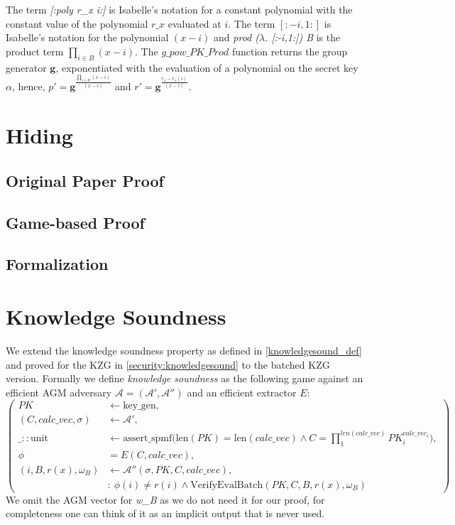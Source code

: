 The term \textit{[:poly r\_x i:]} is Isabelle's notation for a constant polynomial with the constant value of the polynomial $r\_x$ evaluated at $i$. The term $[:-i,1:]$ is Isabelle's notation for the polynomial $(x-i)$ and \textit{prod ($\lambda$. [:-i,1:]) B} is the product term $\prod_{i\in B}^{}(x-i)$. The $g\_pow\_PK\_Prod$ function returns the group generator $\mathbf{g}$, exponentiated with the evaluation of a polynomial on the secret key $\alpha$, hence, $p'=\mathbf{g}^{\frac{\prod_{i\in B}^{}(x-i)}{(x-i)}}$ and $r'=\mathbf{g}^{\frac{r_x-r_x(i)}{(x-i)}}$.

\section{Hiding}

\subsection*{Original Paper Proof}

\subsection*{Game-based Proof}

\subsection*{Formalization}

\section{Knowledge Soundness}
We extend the knowledge soundness property as defined in \ref{knowledgesound_def}
and proved for the KZG in \ref{security:knowledgesound} to the batched KZG version. Formally we define \textit{knowledge soundness} as the following game against an efficient AGM adversary $\mathcal{A=(A',A'')}$ and an efficient extractor $E$: 
\begin{equation*}
    \left(
        \begin{aligned}
            PK &\leftarrow \text{key\_gen}, \\
            (C,calc\_vec, \sigma) &\leftarrow \mathcal{A'}, \\
            \_::\text{unit} &\leftarrow \text{assert\_spmf}\biggl(\text{len}(PK)=\text{len}(calc\_vec) \land C = \prod_{1}^{len(calc\_vec)}PK_i^{calc\_vec_i}\biggr), \\
            \phi &= E(C, calc\_vec),\\
            (i, B, r(x), \omega_B) &\leftarrow \mathcal{A''}(\sigma, PK, C, calc\_vec), \\
            & : \ \phi(i) \ne r(i) \land \text{VerifyEvalBatch}(PK,C,B,r(x),\omega_B)
        \end{aligned}
        \right)
\end{equation*}
We omit the AGM vector for \textit{w\_B} as we do not need it for our proof, for completeness one can think of it as an implicit output that is never used.

